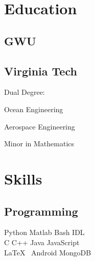 \documentclass[letterpaper]{deedy-resume} %
\begin{document}
\begin{minipage}[t]{0.30\textwidth} %


\section{Education} 

\subsection{GWU}


\sectionspace %



\subsection{Virginia Tech}


Dual Degree: \\
\begin{tightitemize}
\vspace{\topsep}
\item Ocean Engineering
\item Aerospace Engineering
\end{tightitemize}
Minor in Mathematics \\


\sectionspace %


\section{Skills}

\subsection{Programming}

   Python \textbullet{} Matlab \textbullet{} Bash \textbullet{} IDL \\ 
   C \textbullet{} C++ \textbullet{} Java \textbullet{} JavaScript \\
   \LaTeX\ \textbullet{} Android \textbullet{} MongoDB


\end{minipage}
\end{document}
